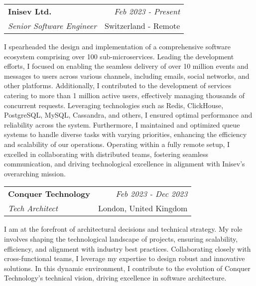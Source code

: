 \documentclass[a4paper,10pt]{article}
\makeatletter
\newcommand{\resumeSubheading}[4]{
	\vspace{0.5mm}\item
	\begin{tabular*}{0.98\textwidth}[t]{l@{\extracolsep{\fill}}r}
		\textbf{#1} & \textit{\footnotesize{#4}} \\
		\textit{\footnotesize{#3}} &  \footnotesize{#2}\\
	\end{tabular*}
	\vspace{-2.4mm}
}
\newcommand{\resumeItemListStart}{\begin{justify}\begin{itemize}[leftmargin=3ex, rightmargin=2ex, noitemsep,labelsep=1.2mm,itemsep=0mm]\small}
\newcommand{\resumeItemListEnd}{\end{itemize}\end{justify}\vspace{-2mm}}
\makeatother
\begin{document}
\vspace{-1mm}
\resumeSubheading
{Inisev Ltd.}{Switzerland - Remote}
{Senior Software Engineer}{Feb 2023 - Present}
\resumeItemListStart
I spearheaded the design and implementation of a comprehensive software ecosystem comprising over 100 sub-microservices. Leading the development efforts, I focused on enabling the seamless delivery of over 10 million events and messages to users across various channels, including emails, social networks, and other platforms. Additionally, I contributed to the development of services catering to more than 1 million active users, effectively managing thousands of concurrent requests. Leveraging technologies such as Redis, ClickHouse, PostgreSQL, MySQL, Cassandra, and others, I ensured optimal performance and reliability across the system. Furthermore, I maintained and optimized queue systems to handle diverse tasks with varying priorities, enhancing the efficiency and scalability of our operations. Operating within a fully remote setup, I excelled in collaborating with distributed teams, fostering seamless communication, and driving technological excellence in alignment with Inisev's overarching mission.
\resumeItemListEnd

\vspace{-1mm}
\resumeSubheading
{Conquer Technology}{London, United Kingdom}
{Tech Architect}{Feb 2023 - Dec 2023}
\resumeItemListStart
I am at the forefront of architectural decisions and technical strategy. My role involves shaping the technological landscape of projects, ensuring scalability, efficiency, and alignment with industry best practices. Collaborating closely with cross-functional teams, I leverage my expertise to design robust and innovative solutions. In this dynamic environment, I contribute to the evolution of Conquer Technology's technical vision, driving excellence in software architecture.
\resumeItemListEnd
\end{document}
